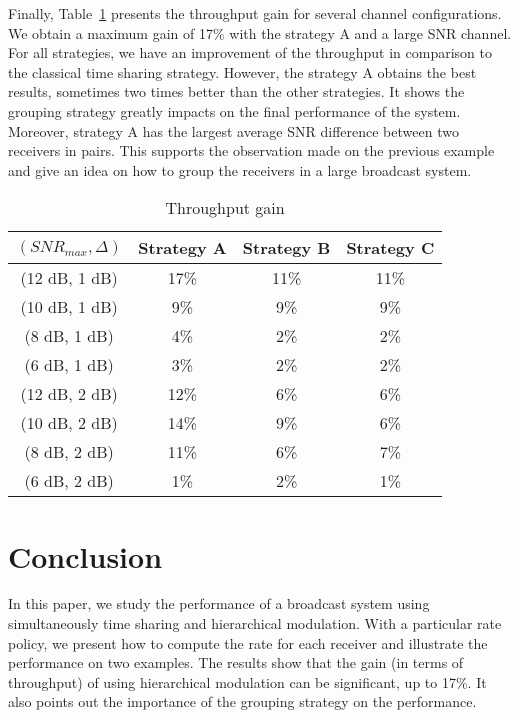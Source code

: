 \documentclass[conference, letterpaper]{IEEEtran}
\begin{document}
Finally, Table~\ref{gain_sh} presents the throughput gain for several channel configurations. We obtain a maximum gain of 17\% with the strategy A and a large SNR channel. For all strategies, we have an improvement of the throughput in comparison to the classical time sharing strategy. However, the strategy A obtains the best results, sometimes two times better than the other strategies. It shows the grouping strategy greatly impacts on the final performance of the system. Moreover, strategy A has the largest average SNR difference between two receivers in pairs. This supports the observation made on the previous example and give an idea on how to group the receivers in a large broadcast system.

\begin{table}[!ht]
\renewcommand{\arraystretch}{1.1}
\caption{Throughput gain}
\label{gain_sh}
\centering
\begin{tabular}{c|c|c|c}
\hline
$(SNR_{max}, \Delta)$ & Strategy A & Strategy B & Strategy C \\
\hline
\rowcolor{Gray}
(12 dB, 1 dB) & 17\% & 11\% & 11\% \\
\hline
(10 dB, 1 dB) & 9\% & 9\% & 9\% \\
\hline
\rowcolor{Gray}
(8 dB, 1 dB) & 4\% & 2\% & 2\% \\
\hline
(6 dB, 1 dB) & 3\% & 2\% & 2\% \\
\hline
\rowcolor{Gray}
(12 dB, 2 dB) & 12\% & 6\% & 6\% \\
\hline
(10 dB, 2 dB) & 14\% & 9\% & 6\% \\
\hline
\rowcolor{Gray}
(8 dB, 2 dB) & 11\% & 6\% & 7\% \\
\hline
(6 dB, 2 dB) & 1\% & 2\% & 1\% \\
\hline
\end{tabular}
\end{table}
 \section{Conclusion}\label{conclusion}

In this paper, we study the performance of a broadcast system using simultaneously time sharing and hierarchical modulation. With a particular rate policy, we present how to compute the rate for each receiver and illustrate the performance on two examples. The results show that the gain (in terms of throughput) of using hierarchical modulation can be significant, up to 17\%. It also points out the importance of the grouping strategy on the performance.
\end{document}
